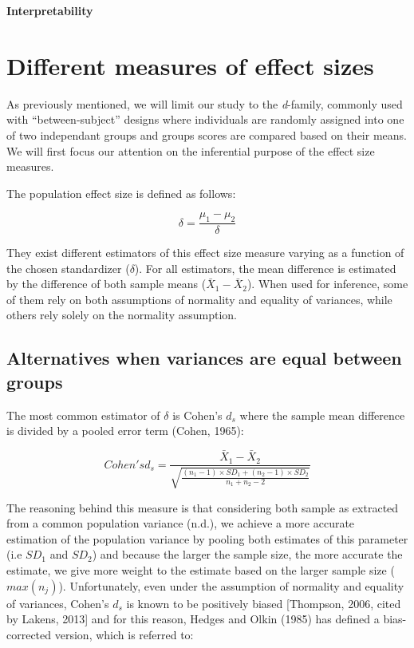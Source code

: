 \documentclass[man]{apa6}
\begin{document}
\textbf{Interpretability}

\hypertarget{different-measures-of-effect-sizes}{%
\section{Different measures of effect sizes}\label{different-measures-of-effect-sizes}}

As previously mentioned, we will limit our study to the \emph{d}-family, commonly used with \enquote{between-subject} designs where individuals are randomly assigned into one of two independant groups and groups scores are compared based on their means. We will first focus our attention on the inferential purpose of the effect size measures.

The population effect size is defined as follows:

\begin{equation} 
\delta = \frac{\mu_{1}-\mu_{2}}{\delta} 
\label{eq:Cohendelta}
\end{equation}

They exist different estimators of this effect size measure varying as a function of the chosen standardizer (\(\delta\)). For all estimators, the mean difference is estimated by the difference of both sample means (\(\bar{X}_1-\bar{X}_2\)). When used for inference, some of them rely on both assumptions of normality and equality of variances, while others rely solely on the normality assumption.

\hypertarget{alternatives-when-variances-are-equal-between-groups}{%
\subsection{Alternatives when variances are equal between groups}\label{alternatives-when-variances-are-equal-between-groups}}

The most common estimator of \(\delta\) is Cohen's \(d_{s}\) where the sample mean difference is divided by a pooled error term (Cohen, 1965):

\begin{equation} 
Cohen's d_s = \frac{\bar{X}_1-\bar{X}_2}{\sqrt{\frac{(n_1-1) \times SD_1+(n_2-1) \times SD_2}{n_1+n_2-2}}} 
\label{eq:Cohends}
\end{equation}

The reasoning behind this measure is that considering both sample as extracted from a common population variance (n.d.), we achieve a more accurate estimation of the population variance by pooling both estimates of this parameter (i.e \(SD_1\) and \(SD_2\)) and because the larger the sample size, the more accurate the estimate, we give more weight to the estimate based on the larger sample size (\(max(n_j)\)). Unfortunately, even under the assumption of normality and equality of variances, Cohen's \(d_s\) is known to be positively biased {[}Thompson, 2006, cited by Lakens, 2013{]} and for this reason, Hedges and Olkin (1985) has defined a bias-corrected version, which is referred to:
\end{document}
